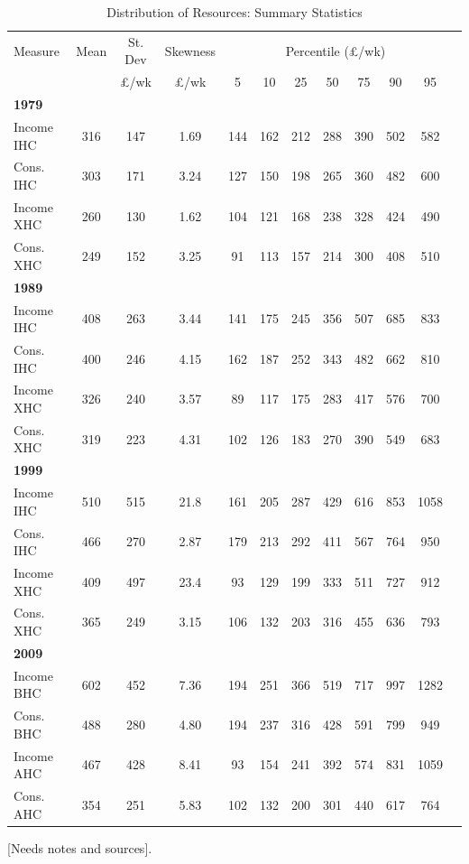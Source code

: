 \begin{table}[bp!]
\caption{Distribution of Resources: Summary Statistics}
\centering
\begin{tabular}{lccccccccccc}
\hline\hline 	
Measure &  Mean & St. Dev  & Skewness &\multicolumn{7}{c}{Percentile (\pounds/wk)} \\
 & & \pounds/wk & \pounds/wk & 5 & 10 & 25 & 50 & 75 & 90 & 95 \\
\hline
\multicolumn{10}{l}{\textbf{1979}}  \\
Income IHC & 316 & 147 &  1.69 & 144 & 162 & 212 & 288 & 390 & 502 & 582 \\
Cons. IHC &303&171 & 3.24& 127&150&198&265&360&482&600 \\
Income XHC &260&130&1.62&104&121&168&238&328&424&490 \\
Cons. XHC &249&152&3.25&91&113&157&214&300&408&510 \\
\hline
\multicolumn{10}{l}{\textbf{1989}}  \\
Income IHC & 408&263&3.44&141&175&245&356&507&685&833 \\
Cons. IHC 	& 400&246&4.15&162&187&252&343&482&662&810 \\
Income XHC  		& 326&240&3.57&89&117&175&283&417&576&700 \\
Cons. XHC  	& 319&223&4.31&102&126&183&270&390&549&683 \\
\hline
\multicolumn{10}{l}{\textbf{1999}}  \\
Income IHC & 510&515&21.8&161&205&287&429&616&853&1058 \\
Cons. IHC & 466&270&2.87&179&213&292&411&567&764&950 \\
Income XHC & 409&497&23.4&93&129&199&333&511&727&912 \\
Cons. XHC &365&249&3.15&106&132&203&316&455&636&793 \\
\hline
\multicolumn{10}{l}{\textbf{2009}}  \\
Income BHC & 602&452&7.36&194&251&366&519&717&997&1282 \\
Cons. BHC &488&280&4.80&194&237&316&428&591&799&949 \\
Income AHC &467&428&8.41&93&154&241&392&574&831&1059 \\
Cons. AHC &354&251&5.83&102&132&200&301&440&617&764 \\
\hline\hline
\end{tabular}
\label{table:prctile}
\end{table}

[Needs notes and sources].

